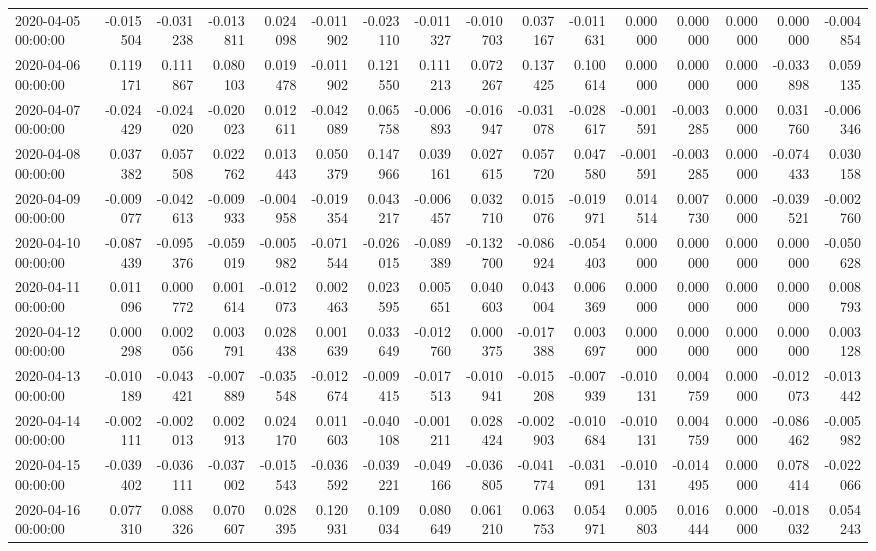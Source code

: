\begin{tabular}{lrrrrrrrrrrrrrrr}
2020-04-05 00:00:00 & -0.015504 & -0.031238 & -0.013811 & 0.024098 & -0.011902 & -0.023110 & -0.011327 & -0.010703 & 0.037167 & -0.011631 & 0.000000 & 0.000000 & 0.000000 & 0.000000 & -0.004854 \\
2020-04-06 00:00:00 & 0.119171 & 0.111867 & 0.080103 & 0.019478 & -0.011902 & 0.121550 & 0.111213 & 0.072267 & 0.137425 & 0.100614 & 0.000000 & 0.000000 & 0.000000 & -0.033898 & 0.059135 \\
2020-04-07 00:00:00 & -0.024429 & -0.024020 & -0.020023 & 0.012611 & -0.042089 & 0.065758 & -0.006893 & -0.016947 & -0.031078 & -0.028617 & -0.001591 & -0.003285 & 0.000000 & 0.031760 & -0.006346 \\
2020-04-08 00:00:00 & 0.037382 & 0.057508 & 0.022762 & 0.013443 & 0.050379 & 0.147966 & 0.039161 & 0.027615 & 0.057720 & 0.047580 & -0.001591 & -0.003285 & 0.000000 & -0.074433 & 0.030158 \\
2020-04-09 00:00:00 & -0.009077 & -0.042613 & -0.009933 & -0.004958 & -0.019354 & 0.043217 & -0.006457 & 0.032710 & 0.015076 & -0.019971 & 0.014514 & 0.007730 & 0.000000 & -0.039521 & -0.002760 \\
2020-04-10 00:00:00 & -0.087439 & -0.095376 & -0.059019 & -0.005982 & -0.071544 & -0.026015 & -0.089389 & -0.132700 & -0.086924 & -0.054403 & 0.000000 & 0.000000 & 0.000000 & 0.000000 & -0.050628 \\
2020-04-11 00:00:00 & 0.011096 & 0.000772 & 0.001614 & -0.012073 & 0.002463 & 0.023595 & 0.005651 & 0.040603 & 0.043004 & 0.006369 & 0.000000 & 0.000000 & 0.000000 & 0.000000 & 0.008793 \\
2020-04-12 00:00:00 & 0.000298 & 0.002056 & 0.003791 & 0.028438 & 0.001639 & 0.033649 & -0.012760 & 0.000375 & -0.017388 & 0.003697 & 0.000000 & 0.000000 & 0.000000 & 0.000000 & 0.003128 \\
2020-04-13 00:00:00 & -0.010189 & -0.043421 & -0.007889 & -0.035548 & -0.012674 & -0.009415 & -0.017513 & -0.010941 & -0.015208 & -0.007939 & -0.010131 & 0.004759 & 0.000000 & -0.012073 & -0.013442 \\
2020-04-14 00:00:00 & -0.002111 & -0.002013 & 0.002913 & 0.024170 & 0.011603 & -0.040108 & -0.001211 & 0.028424 & -0.002903 & -0.010684 & -0.010131 & 0.004759 & 0.000000 & -0.086462 & -0.005982 \\
2020-04-15 00:00:00 & -0.039402 & -0.036111 & -0.037002 & -0.015543 & -0.036592 & -0.039221 & -0.049166 & -0.036805 & -0.041774 & -0.031091 & -0.010131 & -0.014495 & 0.000000 & 0.078414 & -0.022066 \\
2020-04-16 00:00:00 & 0.077310 & 0.088326 & 0.070607 & 0.028395 & 0.120931 & 0.109034 & 0.080649 & 0.061210 & 0.063753 & 0.054971 & 0.005803 & 0.016444 & 0.000000 & -0.018032 & 0.054243 \\

\end{tabular}
